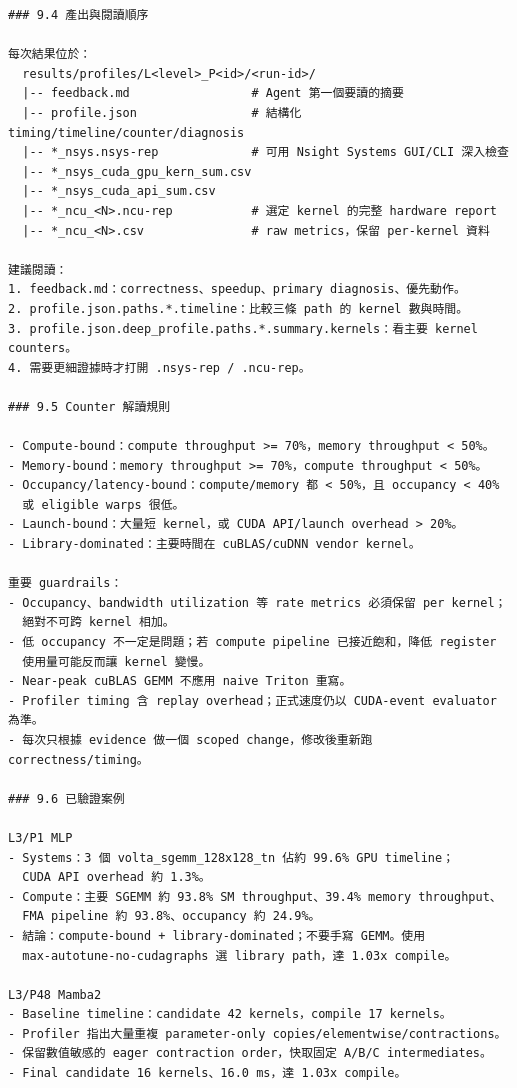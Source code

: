 \documentclass[conference]{IEEEtran}
\begin{document}
\begin{lstlisting}
### 9.4 產出與閱讀順序

每次結果位於：
  results/profiles/L<level>_P<id>/<run-id>/
  |-- feedback.md                 # Agent 第一個要讀的摘要
  |-- profile.json                # 結構化 timing/timeline/counter/diagnosis
  |-- *_nsys.nsys-rep             # 可用 Nsight Systems GUI/CLI 深入檢查
  |-- *_nsys_cuda_gpu_kern_sum.csv
  |-- *_nsys_cuda_api_sum.csv
  |-- *_ncu_<N>.ncu-rep           # 選定 kernel 的完整 hardware report
  |-- *_ncu_<N>.csv               # raw metrics，保留 per-kernel 資料

建議閱讀：
1. feedback.md：correctness、speedup、primary diagnosis、優先動作。
2. profile.json.paths.*.timeline：比較三條 path 的 kernel 數與時間。
3. profile.json.deep_profile.paths.*.summary.kernels：看主要 kernel counters。
4. 需要更細證據時才打開 .nsys-rep / .ncu-rep。

### 9.5 Counter 解讀規則

- Compute-bound：compute throughput >= 70%，memory throughput < 50%。
- Memory-bound：memory throughput >= 70%，compute throughput < 50%。
- Occupancy/latency-bound：compute/memory 都 < 50%，且 occupancy < 40%
  或 eligible warps 很低。
- Launch-bound：大量短 kernel，或 CUDA API/launch overhead > 20%。
- Library-dominated：主要時間在 cuBLAS/cuDNN vendor kernel。

重要 guardrails：
- Occupancy、bandwidth utilization 等 rate metrics 必須保留 per kernel；
  絕對不可跨 kernel 相加。
- 低 occupancy 不一定是問題；若 compute pipeline 已接近飽和，降低 register
  使用量可能反而讓 kernel 變慢。
- Near-peak cuBLAS GEMM 不應用 naive Triton 重寫。
- Profiler timing 含 replay overhead；正式速度仍以 CUDA-event evaluator 為準。
- 每次只根據 evidence 做一個 scoped change，修改後重新跑 correctness/timing。

### 9.6 已驗證案例

L3/P1 MLP
- Systems：3 個 volta_sgemm_128x128_tn 佔約 99.6% GPU timeline；
  CUDA API overhead 約 1.3%。
- Compute：主要 SGEMM 約 93.8% SM throughput、39.4% memory throughput、
  FMA pipeline 約 93.8%、occupancy 約 24.9%。
- 結論：compute-bound + library-dominated；不要手寫 GEMM。使用
  max-autotune-no-cudagraphs 選 library path，達 1.03x compile。

L3/P48 Mamba2
- Baseline timeline：candidate 42 kernels，compile 17 kernels。
- Profiler 指出大量重複 parameter-only copies/elementwise/contractions。
- 保留數值敏感的 eager contraction order，快取固定 A/B/C intermediates。
- Final candidate 16 kernels、16.0 ms，達 1.03x compile。


\end{lstlisting}
\end{document}
